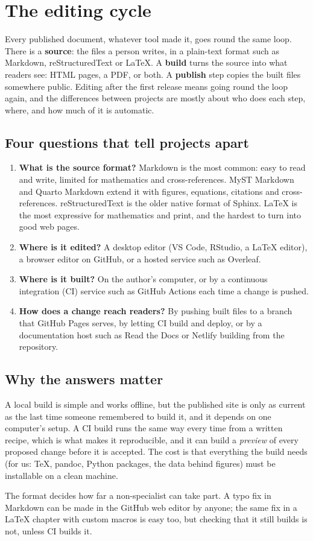 \chapter{The editing cycle}

Every published document, whatever tool made it, goes round the same loop. There is a \textbf{source}: the files a person writes, in a plain-text format such as Markdown, reStructuredText or LaTeX. A \textbf{build} turns the source into what readers see: HTML pages, a PDF, or both. A \textbf{publish} step copies the built files somewhere public. Editing after the first release means going round the loop again, and the differences between projects are mostly about who does each step, where, and how much of it is automatic.

\section{Four questions that tell projects apart}

\begin{enumerate}
\item \textbf{What is the source format?} Markdown is the most common: easy to read and write, limited for mathematics and cross-references. MyST Markdown and Quarto Markdown extend it with figures, equations, citations and cross-references. reStructuredText is the older native format of Sphinx. LaTeX is the most expressive for mathematics and print, and the hardest to turn into good web pages.
\item \textbf{Where is it edited?} A desktop editor (VS Code, RStudio, a LaTeX editor), a browser editor on GitHub, or a hosted service such as Overleaf.
\item \textbf{Where is it built?} On the author's computer, or by a continuous integration (CI) service such as GitHub Actions each time a change is pushed.
\item \textbf{How does a change reach readers?} By pushing built files to a branch that GitHub Pages serves, by letting CI build and deploy, or by a documentation host such as Read the Docs or Netlify building from the repository.
\end{enumerate}

\section{Why the answers matter}

A local build is simple and works offline, but the published site is only as current as the last time someone remembered to build it, and it depends on one computer's setup. A CI build runs the same way every time from a written recipe, which is what makes it reproducible, and it can build a \emph{preview} of every proposed change before it is accepted. The cost is that everything the build needs (for us: TeX, pandoc, Python packages, the data behind figures) must be installable on a clean machine.

The format decides how far a non-specialist can take part. A typo fix in Markdown can be made in the GitHub web editor by anyone; the same fix in a LaTeX chapter with custom macros is easy too, but checking that it still builds is not, unless CI builds it.
